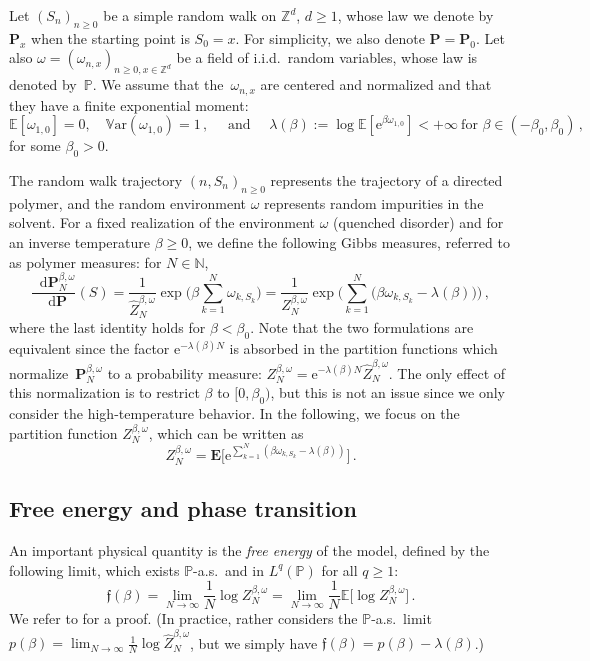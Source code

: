 \documentclass[11pt]{amsart}
\numberwithin{equation}{section}
\newcommand*{\EE}{\mathbb{E}}
\newcommand*{\PP}{\mathbb{P}}
\newcommand*{\bE}{\mathbf{E}}
\newcommand*{\bP}{\mathbf{P}}
\newcommand*{\numberset}{\mathbb}
\newcommand*{\N}{\numberset{N}}
\newcommand*{\Z}{\numberset{Z}}
\newcommand{\e}{\mathrm{e}}
\newcommand*{\tf}{\mathfrak{f}}
\newcommand*{\Var}{\mathbb{V}\mathrm{ar}}
\newcommand*\dd{\mathop{}\!\mathrm{d}}
\theoremstyle{plain}
\theoremstyle{definition}
\theoremstyle{remark}
\begin{document}
Let \((S_n)_{n\geq 0}\) be a simple random walk on \(\Z^d\), \(d\geq 1\), whose law we denote by \(\bP_x\) when the starting point is \(S_0=x\).
For simplicity, we also denote \(\bP=\bP_0\).
Let also \(\omega = (\omega_{n,x})_{n\geq 0,x\in \Z^d}\) be a field of i.i.d.\ random variables, whose law is denoted by~\(\PP\). We assume that the~\(\omega_{n,x}\) are centered and normalized and that they have a finite exponential moment:
\begin{equation}
       \label{hyp:omega}
       \EE[\omega_{1,0}] =0, \quad \Var(\omega_{1,0})=1\,,
       \quad \text{ and } \quad \lambda (\beta) := \log \EE[\e^{\beta\omega_{1,0}}] <+\infty \ \text{for } \beta \in (-\beta_0,\beta_0) \,,
\end{equation}
for some \(\beta_0>0\).

The random walk trajectory \((n,S_n)_{n\geq 0}\) represents the trajectory of a directed polymer, and the random environment \(\omega\) represents random impurities in the solvent.
For a fixed realization of the environment \(\omega\) (quenched disorder) and for an inverse temperature \(\beta\geq 0\), we define the following Gibbs measures, referred to as polymer measures: for \(N\in \N\),
\begin{equation*}
       \frac{\dd \bP_{N}^{\beta,\omega}}{\dd \bP}(S) = \frac{1}{\hat{Z}_{N}^{\beta,\omega}} \exp\Big( \beta\sum_{k=1}^{N}  \omega_{k,S_k}\Big) = \frac{1}{Z_{N}^{\beta,\omega}} \exp\Big( \sum_{k=1}^{N} \big( \beta \omega_{k,S_k} -\lambda(\beta) \big)\Big) \,,
\end{equation*}
where the last identity holds for \(\beta<\beta_0\).
Note that the two formulations are equivalent since the factor \(\e^{-\lambda(\beta)N}\) is absorbed in the partition functions which normalize~\(\bP_{N}^{\beta,\omega}\) to a probability measure: \(Z_{N}^{\beta,\omega} =\e^{-\lambda(\beta)N}\hat{Z}_{N}^{\beta,\omega}\). 
The only effect of this normalization is to restrict \(\beta\) to \([0,\beta_0)\), but this is not an issue since we only consider the high-temperature behavior.
In the following, we focus on the partition function \(Z_{N}^{\beta,\omega}\), which can be written as
\[
Z_N^{\beta,\omega} =\bE\Big[ \e^{\sum_{k=1}^{N}(\beta\omega_{k,S_k} - \lambda(\beta))} \Big] \,.
\]


\subsection{Free energy and phase transition}

An important physical quantity is the \emph{free energy} of the model, defined by the following limit, which exists \(\PP\)-a.s.\ and in \(L^q(\PP)\) for all \(q\geq 1\):
\begin{equation}
       \label{def:free-energy}
       \tf(\beta) = \lim_{N\to\infty} \frac1N \log Z_N^{\beta,\omega} = \lim_{N\to\infty} \frac1N \EE \big[\log Z_N^{\beta,\omega}\big] \,.
\end{equation}
We refer to \cite[Theorem~2.1]{Com17} for a proof.
(In practice, \cite{Com17} rather considers the \(\PP\)-a.s.\ limit \(p(\beta) = \lim_{N\to\infty} \frac1N \log \hat{Z}_{N}^{\beta,\omega}\), but we simply have \(\tf(\beta) = p(\beta)-\lambda(\beta)\).)
\end{document}
